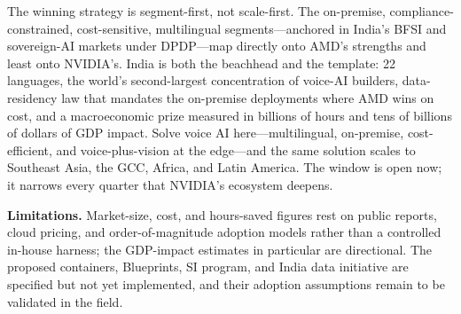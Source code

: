 \documentclass[blind]{gtac}
\begin{document}
The winning strategy is segment-first, not scale-first. The on-premise, compliance-constrained, cost-sensitive, multilingual segments---anchored in India's BFSI and sovereign-AI markets under DPDP---map directly onto AMD's strengths and least onto NVIDIA's. India is both the beachhead and the template: 22 languages, the world's second-largest concentration of voice-AI builders, data-residency law that mandates the on-premise deployments where AMD wins on cost, and a macroeconomic prize measured in billions of hours and tens of billions of dollars of GDP impact. Solve voice AI here---multilingual, on-premise, cost-efficient, and voice-plus-vision at the edge---and the same solution scales to Southeast Asia, the GCC, Africa, and Latin America. The window is open now; it narrows every quarter that NVIDIA's ecosystem deepens.

\textbf{Limitations.} Market-size, cost, and hours-saved figures rest on public reports, cloud pricing, and order-of-magnitude adoption models rather than a controlled in-house harness; the GDP-impact estimates in particular are directional. The proposed containers, Blueprints, SI program, and India data initiative are specified but not yet implemented, and their adoption assumptions remain to be validated in the field.

\begingroup
\let\itshape\upshape


\endgroup
\end{document}
